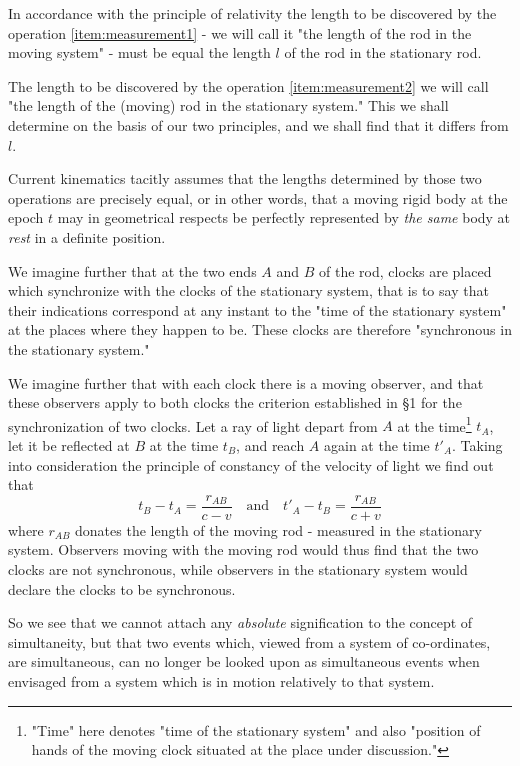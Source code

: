 In accordance with the principle of relativity the length to be discovered by the operation \ref{item:measurement1} - we will call it "the length of the rod in the moving system" - must be equal the length $l$ of the rod in the stationary rod.

The length to be discovered by the operation \ref{item:measurement2} we will call "the length of the (moving) rod in the stationary system." This we shall determine on the basis of our two principles, and we shall find that it differs from $l$.

Current kinematics tacitly assumes that the lengths determined by those two operations are precisely equal, or in other words, that a moving rigid body at the epoch $t$ may in geometrical respects be perfectly represented by \textit{the same} body at \textit{rest} in a definite position.

We imagine further that at the two ends $A$ and $B$ of the rod, clocks are placed which synchronize with the clocks of the stationary system, that is to say that their indications correspond at any instant to the "time of the stationary system" at the places where they happen to be. These clocks are therefore "synchronous in the stationary system."

We imagine further that with each clock there is a moving observer, and that these observers apply to both clocks the criterion established in \S 1 for the synchronization of two clocks. Let a ray of light depart from $A$ at the time\footnote{"Time" here denotes "time of the stationary system" and also "position of hands of the moving clock situated at the place under discussion."} $t_A$, let it be reflected at $B$ at the time $t_B$, and reach $A$ again at the time $t'_A$. Taking into consideration the principle of constancy of the velocity of light we find out that $$ t_B - t_A = \frac{r_{AB}}{c-v} \quad\text{and}\quad t'_A - t_B = \frac{r_{AB}}{c+v} $$ where $r_{AB}$ donates the length of the moving rod - measured in the stationary system. Observers moving with the moving rod would thus find that the two clocks are not synchronous, while observers in the stationary system would declare the clocks to be synchronous.

So we see that we cannot attach any \textit{absolute} signification to the concept of simultaneity, but that two events which, viewed from a system of co-ordinates, are simultaneous, can no longer be looked upon as simultaneous events when envisaged from a system which is in motion relatively to that system.


